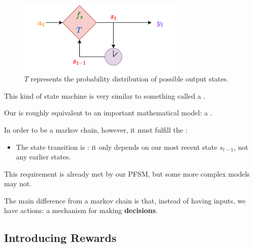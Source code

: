 
        \begin{figure}[H]
            \centering
            \includegraphics[width=80mm,scale=0.5]{images/mdp_images/transition_T.png}
            
            \caption*{$T$ represents the probability distribution of possible output states.}
        \end{figure}

        This kind of state machine is very similar to something called a .\\

        \begin{remark}
            Our  is roughly equivalent to an important mathematical model: a .

            In order to be a markov chain, however, it must fulfill the :

            \begin{itemize}
                \item The state transition is : it only depends on our most recent state $s_{t-1}$, not any earlier states.
            \end{itemize}

            This requirement is already met by our PFSM, but some more complex models may not.
        \end{remark}


        The main difference from a markov chain is that, instead of having inputs, we have actions: a mechanism for making \textbf{decisions}.

        

    \pagebreak
    \subsection{Introducing Rewards}

